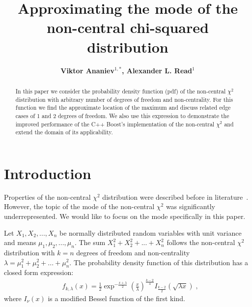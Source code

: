 \documentclass{amsart}
\numberwithin{equation}{section}
\begin{document}
\title[Approximating the mode of the non-central chi-squared distribution]{Approximating the mode of the non-central chi-squared distribution}



\author[Ananiev, Read]{\bfseries Viktor Ananiev$^{1,*}$, Alexander L. Read$^1$}

\address{$^1$Department of Physics, University of Oslo}
\address{$^*$Corresponding author: \textnormal{victor.ananyev@gmail.com}}


\begin{abstract}
In this paper we consider the probability density function (pdf) of the non-central $\chi^2$ distribution with arbitrary number of degrees of freedom and non-centrality. For this function we find the approximate location of the maximum and discuss related edge cases of 1 and 2 degrees of freedom. We also use this expression to demonstrate the improved performance of the C++ Boost's implementation of the non-central $\chi^2$ and extend the domain of its applicability.
\end{abstract}
\maketitle

\section{Introduction}\label{introduction}
Properties of the non-central $\chi^2$ distribution were described before in literature~\cite{Andrs2008, hogan2013, Saulis2001}. However, the topic of the mode of the non-central $\chi^2$ was significantly underrepresented. We would like to focus on the mode specifically in this paper.

Let $X_1, X_2, ..., X_n$ be normally distributed random variables with unit variance and means $\mu_1, \mu_2, ..., \mu_n$. The sum $X_1^2 + X_2^2 + ... + X_n^2$ follows the non-central $\chi^2$ distribution with $k = n$ degrees of freedom and non-centrality $\lambda = \mu_1^2 + \mu_2^2 + ... + \mu_n^2$. The probability density function of this distribution has a closed form expression:
%
\begin{align}
    &f_{k, \lambda}(x) = \frac{1}{2} \exp^{-\frac{x + \lambda}{2}} \left(\frac{x}{\lambda}\right)^{\frac{k-2}{4}} I_{\frac{k-2}{2}}(\sqrt{\lambda x})\;,
\end{align}
%
where $I_{\nu}(x)$ is a modified Bessel function of the first kind.
\end{document}
